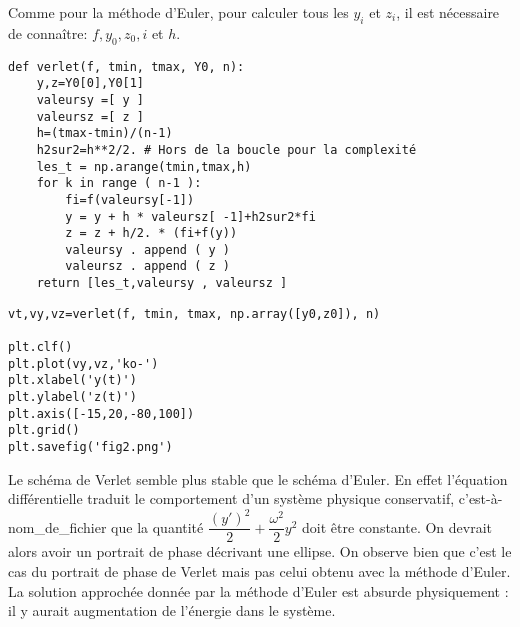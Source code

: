 %
%

\question{}

Comme pour la méthode d'Euler, pour calculer tous les $y_i$ et $z_i$, il est nécessaire de connaître: $f,y_0,z_0,i$ et $h$. 


\begin{lstlisting}
def verlet(f, tmin, tmax, Y0, n):
    y,z=Y0[0],Y0[1]
    valeursy =[ y ]
    valeursz =[ z ]
    h=(tmax-tmin)/(n-1)
    h2sur2=h**2/2. # Hors de la boucle pour la complexité
    les_t = np.arange(tmin,tmax,h)
    for k in range ( n-1 ):
        fi=f(valeursy[-1])
        y = y + h * valeursz[ -1]+h2sur2*fi   
        z = z + h/2. * (fi+f(y))
        valeursy . append ( y )
        valeursz . append ( z )
    return [les_t,valeursy , valeursz ]
\end{lstlisting}



\question{}



\begin{lstlisting}
vt,vy,vz=verlet(f, tmin, tmax, np.array([y0,z0]), n)

plt.clf()
plt.plot(vy,vz,'ko-')
plt.xlabel('y(t)')
plt.ylabel('z(t)')
plt.axis([-15,20,-80,100])
plt.grid()
plt.savefig('fig2.png')
\end{lstlisting}

\question{} Le schéma de Verlet semble plus stable que le schéma d'Euler. 
En effet l'équation différentielle traduit le comportement d'un système physique conservatif, c'est-à-nom\_de\_fichier que la quantité $\dfrac{(y')^2}{2} + \dfrac{\omega^2}{2}y^2$ doit être constante. 
On devrait alors avoir un portrait de phase décrivant une ellipse. 
On observe bien que c'est le cas du portrait de phase de Verlet mais pas celui obtenu avec la méthode d'Euler.
La solution approchée donnée par la méthode d'Euler est absurde physiquement : il y aurait augmentation de l'énergie dans le système. 
